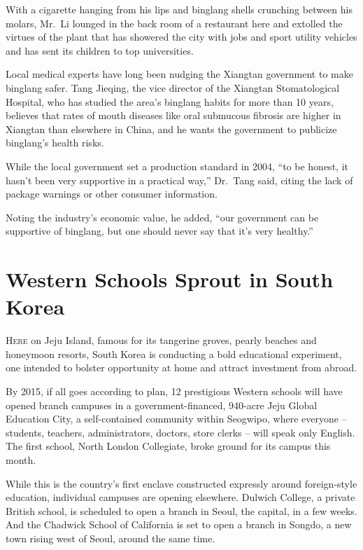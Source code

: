 ﻿\documentclass[12pt]{article}
\begin{document}
With a cigarette hanging from his lips and binglang shells crunching between his molars, Mr.~Li
lounged in the back room of a restaurant here and extolled the virtues of the plant that has
showered the city with jobs and sport utility vehicles and has sent its children to top
universities.

Local medical experts have long been nudging the Xiangtan government to make binglang safer. Tang
Jieqing, the vice director of the Xiangtan Stomatological Hospital, who has studied the area's
binglang habits for more than 10 years, believes that rates of mouth diseases like oral submucous
fibrosis are higher in Xiangtan than elsewhere in China, and he wants the government to publicize
binglang's health risks.

While the local government set a production standard in 2004, ``to be honest, it hasn't been very
supportive in a practical way,'' Dr.~Tang said, citing the lack of package warnings or other
consumer information.

Noting the industry's economic value, he added, ``our government can be supportive of binglang, but
one should never say that it's very healthy.''

\pagebreak
\section{Western Schools Sprout in South Korea}

\lettrine{H}{ere} on Jeju Island, famous for its tangerine groves, pearly
beaches and honeymoon resorts, South Korea is conducting a bold educational experiment, one intended
to bolster opportunity at home and attract investment from abroad.

By 2015, if all goes according to plan, 12 prestigious Western schools will have opened branch
campuses in a government-financed, 940-acre Jeju Global Education City, a self-contained community
within Seogwipo, where everyone -- students, teachers, administrators, doctors, store clerks -- will
speak only English. The first school, North London Collegiate, broke ground for its campus this
month.

While this is the country's first enclave constructed expressly around foreign-style education,
individual campuses are opening elsewhere. Dulwich College, a private British school, is scheduled
to open a branch in Seoul, the capital, in a few weeks. And the Chadwick School of California is set
to open a branch in Songdo, a new town rising west of Seoul, around the same time.
\end{document}
